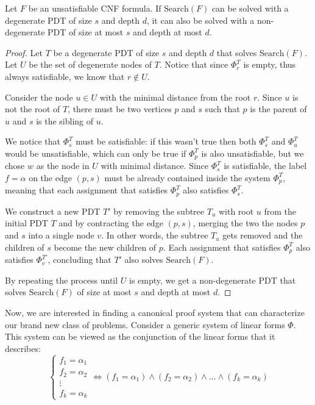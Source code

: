 \begin{proposition}
    \label{degenerate}
    Let $F$ be an unsatisfiable CNF formula. If $\mathrm{Search}(F)$ can be solved with a degenerate PDT of size $s$ and depth $d$, it can also be solved with a non-degenerate PDT of size at most $s$ and depth at most $d$.
\end{proposition}

\begin{proof}
    
    Let $T$ be a degenerate PDT of size $s$ and depth $d$ that solves $\mathrm{Search}(F)$. Let $U$ be the set of degenerate nodes of $T$. Notice that since $\Phi_r^T$ is empty, thus always satisfiable, we know that $r \notin U$.

    Consider the node $u \in U$ with the minimal distance from the root $r$. Since $u$ is not the root of $T$, there must be two vertices $p$ and $s$ such that $p$ is the parent of $u$ and $s$ is the sibling of $u$.

    We notice that $\Phi_s^T$ must be satisfiable: if this wasn't true then both $\Phi_s^T$ and $\Phi_u^T$ would be unsatisfiable, which can only be true if $\Phi_p^T$ is also unsatisfiable, but we chose $w$ as the node in $U$ with minimal distance. Since $\Phi_s^T$ is satisfiable, the label $f = \alpha$ on the edge $(p,s)$ must be already contained inside the system $\Phi_p^T$, meaning that each assignment that satisfies $\Phi_p^T$ also satisfies $\Phi_s^T$.

    We construct a new PDT $T'$ by removing the subtree $T_u$ with root $u$ from the initial PDT $T$ and by contracting the edge $(p,s)$, merging the two the nodes $p$ and $s$ into a single node $v$. In other words, the subtree $T_u$ gets removed and the children of $s$ become the new children of $p$. Each assignment that satisfies $\Phi_p^T$ also satisfies $\Phi_v^{T'}$, concluding that $T'$ also solves $\mathrm{Search}(F)$.

    By repeating the process until $U$ is empty, we get a non-degenerate PDT that solves $\mathrm{Search}(F)$ of size at most $s$ and depth at most $d$.
\end{proof}

\newpage

Now, we are interested in finding a canonical proof system that can characterize our brand new class of problems. Consider a generic system of linear forms $\Phi$. This system can be viewed as the conjunction of the linear forms that it describes:
\[\left \{ \begin{array}{l}
    f_1 = \alpha_1 \\
    f_2 = \alpha_2 \\
    \vdots \\
    f_k = \alpha_k
\end{array}\right . \iff (f_1 = \alpha_1) \land (f_2 = \alpha_2) \land \ldots \land (f_k = \alpha_k)\]

